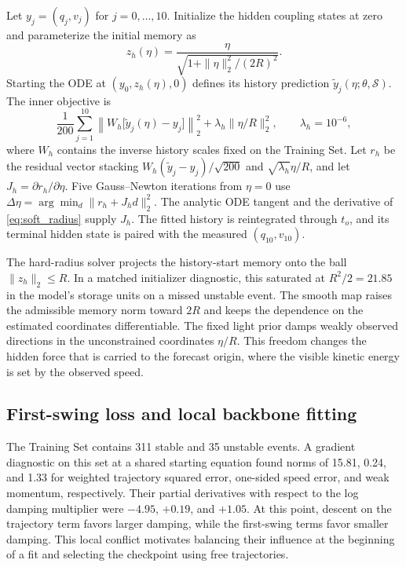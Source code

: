 \documentclass[journal]{IEEEtran}
\begin{document}
Let \(y_j=(q_j,v_j)\) for \(j=0,\ldots,10\). Initialize the hidden coupling
states at zero and parameterize the initial memory as
\begin{equation}
 z_h(\eta)=\frac{\eta}{\sqrt{1+\|\eta\|_2^2/(2R)^2}}.
 \label{eq:soft_radius}
\end{equation}
Starting the ODE at \((y_0,z_h(\eta),0)\) defines its history prediction
\(\tilde y_j(\eta;\theta,\mathcal S)\). The inner objective is
\begin{equation}
 \frac{1}{200}\sum_{j=1}^{10}
 \left\|W_h\bigl[\tilde y_j(\eta)-y_j\bigr]\right\|_2^2
       +\lambda_h\|\eta/R\|_2^2,\qquad
       \lambda_h=10^{-6},
 \label{eq:history}
\end{equation}
where \(W_h\) contains the inverse history scales fixed on the Training Set.
Let \(r_h\) be the residual vector stacking \(W_h(\tilde y_j-y_j)/\sqrt{200}\)
and \(\sqrt{\lambda_h}\eta/R\), and let \(J_h=\partial r_h/\partial\eta\).
Five Gauss--Newton iterations from \(\eta=0\) use
\(\Delta\eta=\arg\min_d\|r_h+J_hd\|_2^2\). The analytic ODE tangent and
the derivative of \eqref{eq:soft_radius} supply \(J_h\). The fitted history
is reintegrated through \(t_o\), and its terminal hidden state is paired with
the measured \((q_{10},v_{10})\).

The hard-radius solver projects the history-start memory onto the ball
\(\|z_h\|_2\le R\). In a matched initializer diagnostic, this saturated
at \(R^2/2=21.85\) in the model's storage units on a missed unstable
event. The smooth map raises the admissible memory norm toward \(2R\) and
keeps the dependence on the estimated coordinates differentiable.
The fixed light prior damps weakly observed directions in the unconstrained
coordinates \(\eta/R\). This freedom changes the hidden force that is
carried to the forecast origin, where the visible kinetic energy is set by
the observed speed.

\subsection{First-swing loss and local backbone fitting}
The Training Set contains 311 stable and 35 unstable events. A gradient
diagnostic on this set at a shared starting equation found norms of 15.81,
0.24, and 1.33 for weighted trajectory squared error, one-sided speed error,
and weak momentum, respectively. Their partial derivatives with respect to
the log damping multiplier were \(-4.95\), \(+0.19\), and \(+1.05\).
At this point, descent on the trajectory term favors larger damping, while
the first-swing terms favor smaller damping. This local conflict motivates
balancing their influence at the beginning of a fit and selecting the
checkpoint using free trajectories.
\end{document}
